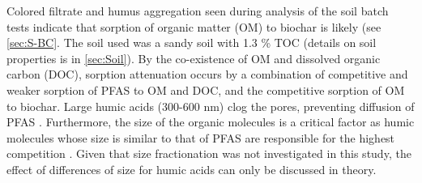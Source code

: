 Colored filtrate and humus aggregation seen during analysis of the soil batch tests indicate that sorption of organic matter (OM) to biochar is likely (see \cref{sec:S-BC}. The soil used was a sandy soil with 1.3 \% TOC (details on soil properties is in \cref{sec:Soil}). By the co-existence of OM and dissolved organic carbon (DOC), sorption attenuation occurs by a combination of competitive and weaker sorption of PFAS to OM and DOC, and the competitive sorption of OM to biochar. Large humic acids (300-600 nm) clog the pores, preventing diffusion of PFAS \citep{Cornelissen2006,kluvcakova2018size}. Furthermore, the size of the organic molecules is a critical factor as humic molecules whose size is similar to that of PFAS are responsible for the highest competition \citep{du2014adsorption}. Given that size fractionation was not investigated in this study, the effect of differences of size for humic acids can only be discussed in theory.

